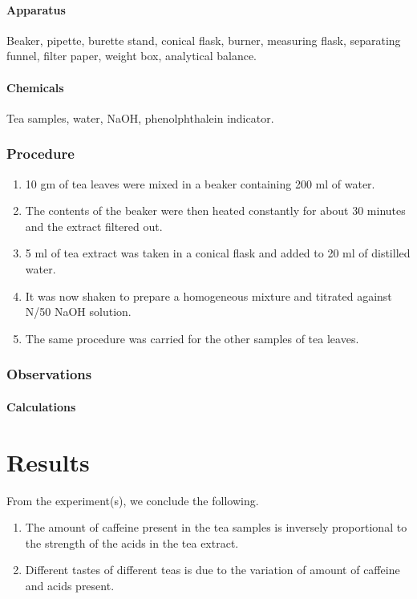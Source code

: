 \documentclass[11pt]{article}
\begin{document}
\paragraph{Apparatus}
Beaker, pipette, burette stand, conical flask, burner, measuring flask, separating funnel, filter
paper, weight box, analytical balance.
\paragraph{Chemicals}
Tea samples, water, NaOH, phenolphthalein indicator.
\subsubsection{Procedure}
\begin{enumerate}
\item 10 gm of tea leaves were mixed in a beaker containing 200 ml of water.
\item The contents of the beaker were then heated constantly for about 30 minutes and the extract
  filtered out.
\item 5 ml of tea extract was taken in a conical flask and added to 20 ml of distilled water.
\item It was now shaken to prepare a homogeneous mixture and titrated against N/50 NaOH solution.
\item The same procedure was carried for the other samples of tea leaves.
\end{enumerate}
\subsubsection{Observations}
\paragraph{Calculations}

\newpage

\section{Results}
From the experiment(s), we conclude the following.
\begin{enumerate}
\item The amount of caffeine present in the tea samples is inversely proportional to the strength of the
  acids in the tea extract.
\item Different tastes of different teas is due to the variation of amount of caffeine and acids
  present.
\end{enumerate}
\end{document}
